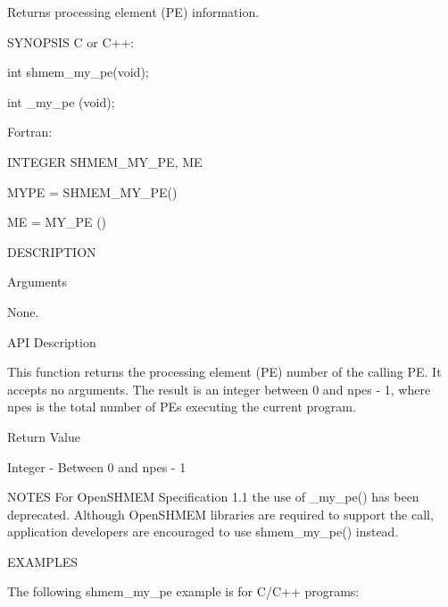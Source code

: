 Returns processing element (PE) information.

SYNOPSIS
       C or C++:

	  int shmem_my_pe(void);

	  int _my_pe (void);

       Fortran:

	  INTEGER SHMEM_MY_PE, ME

	  MYPE = SHMEM_MY_PE()
	  
	  ME = MY_PE ()

DESCRIPTION

Arguments

       None.

API Description

       This function returns the processing element (PE) number of the calling
       PE.   It accepts no arguments.	The result is an integer between 0 and
       npes - 1, where npes is the total number of PEs executing  the  current
       program.

Return Value       
    
       Integer - Between 0 and npes - 1

NOTES
       For OpenSHMEM Specification 1.1 the use of _my_pe() has been deprecated. Although OpenSHMEM libraries are required to support the call, application developers are encouraged to use shmem_my_pe() instead.

EXAMPLES

       The following shmem_my_pe example is for C/C++ programs:

       
